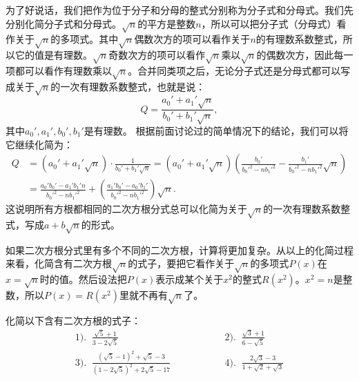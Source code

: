 \documentclass[12pt,UTF8,fontset=none]{ctexbook}
\begin{document}
为了好说话，我们把作为位于分子和分母的整式分别称为分子式和分母式。我们先分别化简分子式和分母式。$\sqrt{n}$的平方是整数$n$，所以可以把分子式（分母式）看作关于$\sqrt{n}$的多项式。其中$\sqrt{n}$偶数次方的项可以看作关于$n$的有理数系数整式，所以它的值是有理数。$\sqrt{n}$奇数次方的项可以看作$\sqrt{n}$乘以$\sqrt{n}$的偶数次方，因此每一项都可以看作有理数乘以$\sqrt{n}$。合并同类项之后，无论分子式还是分母式都可以写成关于$\sqrt{n}$的一次有理数系数整式，也就是说：
$$ Q =  \frac{a_0' + a_1'\sqrt{n}}{b_0' + b_1'\sqrt{n}}, $$
其中$a_0', a_1', b_0' , b_1'$是有理数。
根据前面讨论过的简单情况下的结论，我们可以将它继续化简为：
\begin{align*}
    Q &=  (a_0' + a_1'\sqrt{n})\cdot \frac{1}{b_0' + b_1'\sqrt{n}} = (a_0' + a_1'\sqrt{n}) \left(\frac{b_0'}{b_0'^2 - nb_1'^2} - \frac{b_1'}{b_0'^2 - nb_1'^2}\sqrt{n}\right) \\
    &= \frac{a_0'b_0' - a_1'b_1'n}{b_0'^2 - nb_1'^2} + \left(\frac{a_1'b_0' - a_0'b_1'}{b_0'^2 - nb_1'^2}\right)\sqrt{n}.
\end{align*}
这说明所有方根都相同的二次方根分式总可以化简为关于$\sqrt{n}$的一次有理数系数整式，写成$a + b\sqrt{n}$的形式。

如果二次方根分式里有多个不同的二次方根，计算将更加复杂。从以上的化简过程来看，化简含有二次方根$\sqrt{n}$的式子，要把它看作关于$\sqrt{n}$的多项式$P(x)$在$x = \sqrt{n}$时的值。然后设法把$P(x)$表示成某个关于$x^2$的整式$R(x^2)$。$x^2 = n$是整数，所以$P(x) = R(x^2)$里就不再有$\sqrt{n}$了。

\begin{et}
    化简以下含有二次方根的式子：\\
    $$
    \begin{array}{lll}
       1).\;\; \displaystyle \frac{\sqrt{5} + 1}{3 - 2\sqrt{5}} &  \phantom{00000000} & 2).\;\; \displaystyle \frac{\sqrt{3} + 1}{6 - \sqrt{5}} \\[2em]
       3).\;\; \displaystyle \frac{(\sqrt{5} - 1)^2 + \sqrt{5} - 3}{(1 - 2\sqrt{5})^2 + 2\sqrt{5} - 17} &  \phantom{00000000} & 4).\;\; \displaystyle \frac{2\sqrt{3} - 3}{1 + \sqrt{2} + \sqrt{3}}
    \end{array}
    $$
\end{et}
\end{document}
